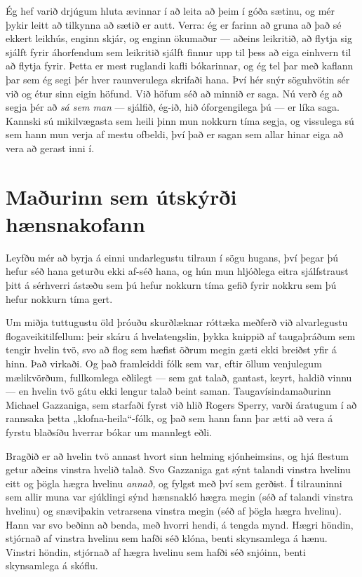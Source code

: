 Ég hef varið drjúgum hluta ævinnar í að leita að þeim í góða sætinu, og mér þykir leitt að tilkynna að sætið er autt. Verra: ég er farinn að gruna að það sé ekkert leikhús, enginn skjár, og enginn ökumaður — aðeins leikritið, að flytja sig sjálft fyrir áhorfendum sem leikritið sjálft finnur upp til þess að eiga einhvern til að flytja fyrir. Þetta er mest ruglandi kafli bókarinnar, og ég tel þar með kaflann þar sem ég segi þér hver raunverulega skrifaði hana. Því hér snýr söguhvötin sér við og étur sinn eigin höfund. Við höfum séð að minnið er saga. Nú verð ég að segja þér að \emph{sá sem man} — sjálfið, ég-ið, hið óforgengilega þú — er líka saga. Kannski sú mikilvægasta sem heili þinn mun nokkurn tíma segja, og vissulega sú sem hann mun verja af mestu ofbeldi, því það er sagan sem allar hinar eiga að vera að gerast inni í.

\section*{Maðurinn sem útskýrði hænsnakofann}

Leyfðu mér að byrja á einni undarlegustu tilraun í sögu hugans, því þegar þú hefur séð hana geturðu ekki af-séð hana, og hún mun hljóðlega eitra sjálfstraust þitt á sérhverri ástæðu sem þú hefur nokkurn tíma gefið fyrir nokkru sem þú hefur nokkurn tíma gert.

Um miðja tuttugustu öld þróuðu skurðlæknar róttæka meðferð við alvarlegustu flogaveikitilfellum: þeir skáru á hvelatengslin, þykka knippið af taugaþráðum sem tengir hvelin tvö, svo að flog sem hæfist öðrum megin gæti ekki breiðst yfir á hinn. Það virkaði. Og það framleiddi fólk sem var, eftir öllum venjulegum mælikvörðum, fullkomlega eðlilegt — sem gat talað, gantast, keyrt, haldið vinnu — en hvelin tvö gátu ekki lengur talað beint saman. Taugavísindamaðurinn Michael Gazzaniga, sem starfaði fyrst við hlið Rogers Sperry, varði áratugum í að rannsaka þetta „klofna-heila“-fólk, og það sem hann fann þar ætti að vera á fyrstu blaðsíðu hverrar bókar um mannlegt eðli.

Bragðið er að hvelin tvö annast hvort sinn helming sjónheimsins, og hjá flestum getur aðeins vinstra hvelið talað. Svo Gazzaniga gat sýnt talandi vinstra hvelinu eitt og þögla hægra hvelinu \emph{annað,} og fylgst með því sem gerðist. Í tilrauninni sem allir muna var sjúklingi sýnd hænsnakló hægra megin (séð af talandi vinstra hvelinu) og snæviþakin vetrarsena vinstra megin (séð af þögla hægra hvelinu). Hann var svo beðinn að benda, með hvorri hendi, á tengda mynd. Hægri höndin, stjórnað af vinstra hvelinu sem hafði séð klóna, benti skynsamlega á hænu. Vinstri höndin, stjórnað af hægra hvelinu sem hafði séð snjóinn, benti skynsamlega á skóflu.

